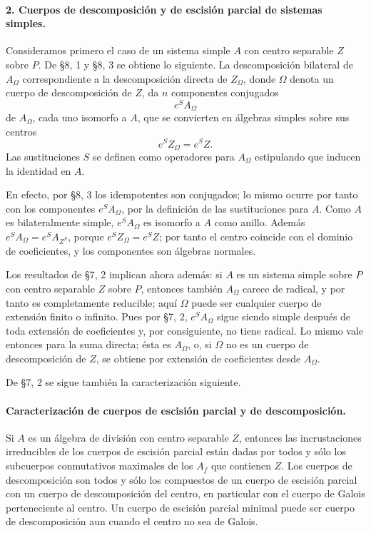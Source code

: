 \paragraph{2. Cuerpos de descomposición y de escisión parcial de sistemas simples.}
Consideramos primero el caso de un sistema simple \(A\) con centro separable \(Z\) sobre \(P\). De §8, 1 y §8, 3 se obtiene lo siguiente. La descomposición bilateral de \(A_\Omega\) correspondiente a la descomposición directa de \(Z_\Omega\), donde \(\Omega\) denota un cuerpo de descomposición de \(Z\), da \(n\) componentes conjugados
\[
        e^S A_\Omega
\]
de \(A_\Omega\), cada uno isomorfo a \(A\), que se convierten en álgebras simples sobre sus centros
\[
        e^S Z_\Omega=e^S Z .
\]
Las sustituciones \(S\) se definen como operadores para \(A_\Omega\) estipulando que inducen la identidad en \(A\).

En efecto, por §8, 3 los idempotentes son conjugados; lo mismo ocurre por tanto con los componentes \(e^S A_\Omega\), por la definición de las sustituciones para \(A\). Como \(A\) es bilateralmente simple, \(e^S A_\Omega\) es isomorfo a \(A\) como anillo. Además \(e^SA_\Omega=e^S A_{Z^S}\), porque \(e^S Z_\Omega=e^S Z\); por tanto el centro coincide con el dominio de coeficientes, y los componentes son álgebras normales.

Los resultados de §7, 2 implican ahora además: si \(A\) es un sistema simple sobre \(P\) con centro separable \(Z\) sobre \(P\), entonces también \(A_\Omega\) carece de radical, y por tanto es completamente reducible; aquí \(\Omega\) puede ser cualquier cuerpo de extensión finito o infinito. Pues por §7, 2, \(e^S A_\Omega\) sigue siendo simple después de toda extensión de coeficientes y, por consiguiente, no tiene radical. Lo mismo vale entonces para la suma directa; ésta es \(A_\Omega\), o, si \(\Omega\) no es un cuerpo de descomposición de \(Z\), se obtiene por extensión de coeficientes desde \(A_\Omega\).

De §7, 2 se sigue también la caracterización siguiente.

\paragraph{Caracterización de cuerpos de escisión parcial y de descomposición.}
Si \(A\) es un álgebra de división con centro separable \(Z\), entonces las incrustaciones irreducibles de los cuerpos de escisión parcial están dadas por todos y sólo los subcuerpos conmutativos maximales de los \(A_f\) que contienen \(Z\). Los cuerpos de descomposición son todos y sólo los compuestos de un cuerpo de escisión parcial con un cuerpo de descomposición del centro, en particular con el cuerpo de Galois perteneciente al centro. Un cuerpo de escisión parcial minimal puede ser cuerpo de descomposición aun cuando el centro no sea de Galois.

